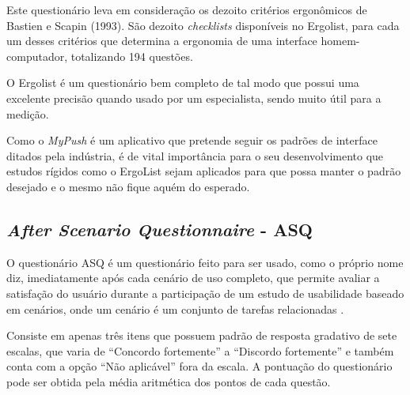       Este questionário leva em consideração os dezoito critérios ergonômicos de Bastien e Scapin (1993). São dezoito \textit{checklists}
      disponíveis no Ergolist, para cada um desses critérios que determina a ergonomia de uma interface homem-computador,
      totalizando 194 questões.
      
      O Ergolist é um questionário bem completo de tal modo que possui uma excelente precisão quando usado por um especialista,
      sendo muito útil para a medição.	

      Como o \textit{MyPush} é um aplicativo que pretende seguir os padrões de interface ditados pela indústria, é de vital
      importância para o seu desenvolvimento que estudos rígidos como o ErgoList sejam aplicados para que possa manter o 
      padrão desejado e o mesmo não fique aquém do esperado.
    
    \subsection{\textit{After Scenario Questionnaire} - ASQ}
    
      O questionário ASQ é um questionário feito para ser usado, como o próprio nome diz, imediatamente após cada cenário de uso
      completo, que permite avaliar a satisfação do usuário durante a participação de um estudo de usabilidade baseado em cenários,
      onde um cenário é um conjunto de tarefas relacionadas \cite{lewis91}.
      
      Consiste em apenas três itens que possuem padrão de resposta gradativo de sete escalas, que varia de “Concordo fortemente” 
      a “Discordo fortemente” e também conta com a opção “Não aplicável” fora da escala. A pontuação do questionário pode ser
      obtida pela média aritmética dos pontos de cada questão.
      

